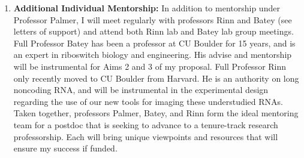 \documentclass{F32}
\begin{document}
\begin{enumerate}
  \item \textbf{Additional Individual Mentorship:} In addition to mentorship under Professor Palmer, I will meet regularly with professors Rinn and Batey (see letters of support) and attend both Rinn lab and Batey lab group meetings. Full Professor Batey has been a professor at CU Boulder for 15 years, and is an expert in riboswitch biology and engineering. His advise and mentorship will be instrumental for Aims 2 and 3 of my proposal. Full Professor Rinn only recently moved to CU Boulder from Harvard. He is an authority on long noncoding RNA, and will be instrumental in the experimental design regarding the use of our new tools for imaging these understudied RNAs. Taken together, professors Palmer, Batey, and Rinn form the ideal mentoring team for a postdoc that is seeking to advance to a tenure-track research professorship. Each will bring unique viewpoints and resources that will ensure my success if funded.

\end{enumerate}
\end{document}
